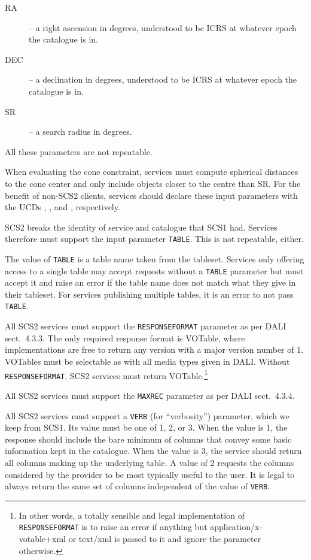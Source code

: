 \documentclass[11pt,a4paper]{ivoa}
\begin{document}
\begin{description}
\item[RA] -- a right ascension in degrees, understood to be ICRS at
whatever epoch the catalogue is in.
\item[DEC] -- a declination in degrees, understood to be ICRS at
whatever epoch the catalogue is in.
\item[SR] -- a search radius in degrees.
\end{description}

All these parameters are not repeatable.

When evaluating the cone constraint, services must compute spherical
distances to the cone center and only include objects closer to the
centre than SR.  For the benefit of 
non-SCS2 clients, services should declare these
input parameters with the UCDs , , and
, respectively.

SCS2 breaks the identity of service and catalogue that SCS1 had.
Services therefore must support the input parameter \verb|TABLE|.  This
is not repeatable, either.

The value of \verb|TABLE| is a table name taken from the tableset.  Services
only offering access to a single table may accept requests without a
\verb|TABLE| parameter but must accept it and raise an error if the table name
does not match what they give in their tableset.  For services
publishing multiple tables, it is an error to not pass \verb|TABLE|.

All SCS2 services must support the \verb|RESPONSEFORMAT| parameter as
per DALI sect.~4.3.3.  The only required response format is VOTable,
where implementations are free to return any version with a major
version number of 1.  VOTables must be selectable as with all media
types given in DALI.  Without \verb|RESPONSEFORMAT|, SCS2 services must return
VOTable.\footnote{In other words, a totally sensible and legal
implementation of \texttt{RESPONSEFORMAT} is to raise an error if anything but
application/x-votable+xml or text/xml is passed to it and ignore the
parameter otherwise.}

All SCS2 services must support the \verb|MAXREC| parameter as per DALI
sect.~4.3.4.

All SCS2 services must support a \verb|VERB| (for ``verbosity'')
parameter, which we keep from SCS1.  Its value must be one of 1, 2, or
3.  When the value is 1, the response should include the bare minimum of
columns that convey some basic information kept in the catalogue.  When
the value is 3, the service should return all columns making up the
underlying table.  A value of 2 requests the columns considered by the
provider to be most typically useful to the user.   It is legal to
always return the same set of columns independent of the value of 
\verb|VERB|.
\end{document}
